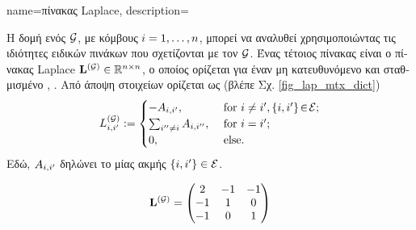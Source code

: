 {name={\foreignlanguage{greek}{πίνακας} Laplace},
	description={\foreignlanguage{greek}{Η δομή ενός}  $\mathcal{G}$,  
		\foreignlanguage{greek}{με κόμβους $i=1, \ldots, n$, μπορεί να αναλυθεί χρησιμοποιώντας τις ιδιότητες ειδικών πινάκων  
		που σχετίζονται με τον $\mathcal{G}$. Ένας τέτοιος πίνακας είναι ο}  
		\foreignlanguage{greek}{πίνακας} Laplace  ${\bf L}^{(\mathcal{G})} \in \mathbb{R}^{n \times n}$, 
		\foreignlanguage{greek}{ο οποίος ορίζεται για έναν μη κατευθυνόμενο και σταθμισμένο}  \cite{Luxburg2007}, \cite{Ng2001}. 
		\foreignlanguage{greek}{Από άποψη στοιχείων ορίζεται ως (βλέπε Σχ.} \ref{fig_lap_mtx_dict})
		\begin{equation}
		L^{(\mathcal{G})}_{i,i'} := \begin{cases} - A_{i,i'}, & \mbox{ for } i\neq i', \{i,i'\}\!\in\!\mathcal{E}; \\ 
			\sum_{i'' \neq i} A_{i,i''}, & \mbox{ for } i = i'; \\ 
							0, & \mbox{ else.} \end{cases}
	 	\end{equation}
  		\foreignlanguage{greek}{Εδώ, $A_{i,i'}$ δηλώνει το}  \foreignlanguage{greek}{μίας 
		ακμής} $\{i,i'\} \in \mathcal{E}$. 
 	 	\begin{figure}[H]
  		\begin{center}
    		\begin{minipage}{0.45\textwidth}
	 	\end{minipage} 
	 	\hspace*{-15mm}
 		\begin{minipage}{0.45\textwidth}
	 			\begin{equation} 
	 				 \LapMat{\graph} = \begin{pmatrix} 2 & -1& -1 \\ -1& 1 & 0 \\  -1 & 0 & 1 \end{pmatrix}  

\end{equation}
\end{minipage}
\end{center}
\end{figure}}}
